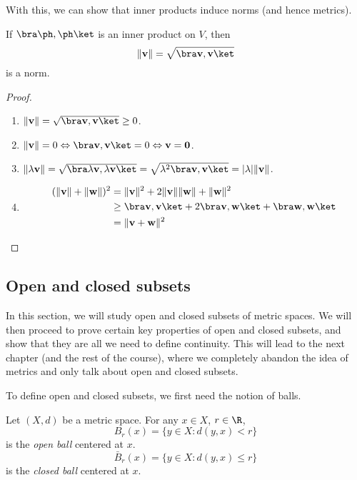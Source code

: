\documentclass[a4paper]{article}
\begin{document}
With this, we can show that inner products induce norms (and hence metrics).
\begin{lemma}
  If $\bra \ph, \ph \ket$ is an inner product on $V$, then
  \[
    \|\mathbf{v}\| = \sqrt{\bra \mathbf{v}, \mathbf{v}\ket}
  \]
  is a norm.
\end{lemma}

\begin{proof}\leavevmode
  \begin{enumerate}
    \item $\|\mathbf{v}\| = \sqrt{\bra \mathbf{v}, \mathbf{v}\ket} \geq 0$.
    \item $\|\mathbf{v}\| = 0\Leftrightarrow \bra \mathbf{v}, \mathbf{v}\ket = 0 \Leftrightarrow \mathbf{v} = \mathbf{0}$.
    \item $\|\lambda \mathbf{v}\| = \sqrt{\bra \lambda \mathbf{v}, \lambda \mathbf{v}\ket} = \sqrt{\lambda^2 \bra \mathbf{v}, \mathbf{v}\ket} = |\lambda| \|\mathbf{v}\|$.
    \item
      \begin{align*}
        (\|\mathbf{v}\| + \|\mathbf{w}\|)^2 &= \|\mathbf{v}\|^2 + 2\|\mathbf{v}\|\|\mathbf{w}\| + \|\mathbf{w}\|^2\\
        &\geq \bra \mathbf{v}, \mathbf{v}\ket + 2\bra \mathbf{v}, \mathbf{w}\ket + \bra \mathbf{w}, \mathbf{w}\ket \\
        &= \|\mathbf{v} + \mathbf{w}\|^2\qedhere
      \end{align*}%
  \end{enumerate}
\end{proof}

\subsection{Open and closed subsets}
In this section, we will study open and closed subsets of metric spaces. We will then proceed to prove certain key properties of open and closed subsets, and show that they are all we need to define continuity. This will lead to the next chapter (and the rest of the course), where we completely abandon the idea of metrics and only talk about open and closed subsets.

To define open and closed subsets, we first need the notion of balls.
\begin{defi}
  Let $(X, d)$ be a metric space. For any $x\in X$, $r\in \R$,
  \[
    B_r(x) = \{y\in X: d(y, x) < r\}
  \]
  is the \emph{open ball} centered at $x$.
  \[
    \bar{B}_r(x) = \{y\in X: d(y, x) \leq r\}
  \]
  is the \emph{closed ball} centered at $x$.
\end{defi}
\end{document}
